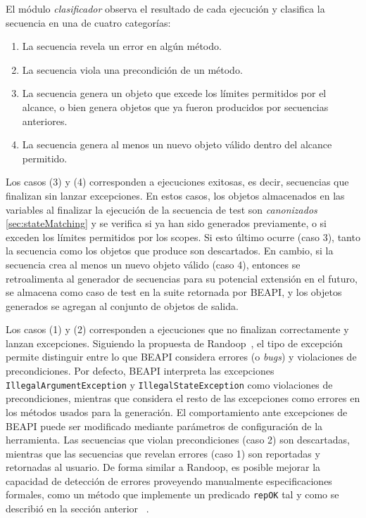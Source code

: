 El módulo \emph{clasificador} observa el resultado de cada ejecución y clasifica 
la secuencia en una de cuatro categorías:
\begin{enumerate}
    \item La secuencia revela un error en algún método.
    \item La secuencia viola una precondición de un método.
    \item La secuencia genera un objeto que excede los límites permitidos por el alcance, o bien genera objetos que ya fueron producidos por secuencias anteriores.
    \item La secuencia genera al menos un nuevo objeto válido dentro del alcance permitido.
\end{enumerate}

Los casos (3) y (4) corresponden a ejecuciones exitosas, es decir, secuencias que finalizan sin lanzar excepciones. 
En estos casos, los objetos almacenados en las variables al finalizar la
ejecución de la secuencia de test son \emph{canonizados} \ref{sec:stateMatching}
y se verifica si ya han sido generados previamente, o si exceden los límites
permitidos por los scopes. 
Si esto último ocurre (caso 3), tanto la secuencia como los objetos que produce son descartados. 
En cambio, si la secuencia crea al menos un nuevo objeto válido (caso 4), 
entonces se retroalimenta al generador de secuencias para su potencial extensión
en el futuro, 
se almacena como caso de test en la suite retornada por BEAPI,
y los objetos generados se agregan al conjunto de objetos de salida.

Los casos (1) y (2) corresponden a ejecuciones que no finalizan correctamente y lanzan excepciones. 
Siguiendo la propuesta de Randoop~\cite{Pacheco07}, el tipo de excepción permite distinguir entre lo que BEAPI considera errores (o \emph{bugs}) 
y violaciones de precondiciones. 
Por defecto, BEAPI interpreta las excepciones \texttt{IllegalArgumentException} y \texttt{IllegalStateException} 
como violaciones de precondiciones, mientras que considera el resto de las
excepciones como errores en los métodos usados para la generación.
El comportamiento ante excepciones de BEAPI puede ser modificado mediante
parámetros de configuración de la herramienta. 
Las secuencias que violan precondiciones (caso 2) son descartadas, 
mientras que las secuencias que revelan errores (caso 1) 
son reportadas y retornadas al usuario. De forma similar a Randoop, 
es posible mejorar la capacidad de detección de errores proveyendo manualmente
especificaciones formales, como un método que implemente un predicado
\texttt{repOK} tal y como se describió en la sección anterior ~\cite{Pacheco07}.

